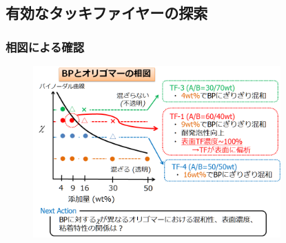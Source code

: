 \documentclass[unicode,12pt]{beamer}%
\begin{document}
\subsection{有効なタッキファイヤーの探索}
\begin{frame}\frametitle{相図による確認}

	\begin{figure}
		\begin{center}
			\includegraphics[width=95mm]{tennkaryou_2.png}
		\end{center}
	\end{figure}
	\end{frame}
\end{document}
